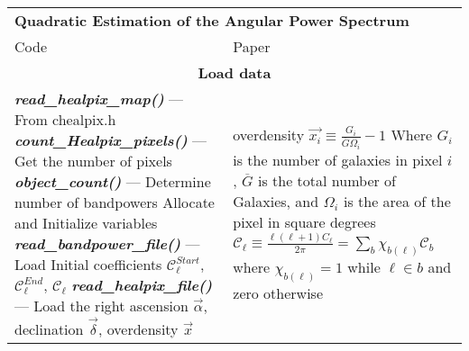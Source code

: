 \documentclass{article}
\newcommand{\func}[1] {\textbf{\textit{#1()}}}
\begin{document}
\setlength\LTleft{0pt}
\setlength\LTright{0pt}
\begin{longtable}{@{\extracolsep{\fill}}p{}
                                         p{}@{}}
\multicolumn{2}{l}{\bf Quadratic Estimation of the Angular Power Spectrum} \\
Code & Paper  \\
\hline
\multicolumn{2}{c}{\bf Load data} \\ \hline
\func{read\_healpix\_map} \newline
--- From chealpix.h \newline
\func{count\_Healpix\_pixels} \newline
--- Get the number of pixels \newline
\func{object\_count} \newline
--- Determine number of bandpowers \newline
Allocate and Initialize variables \newline
\func{read\_bandpower\_file} \newline
--- Load Initial coefficients $\mathcal{C}^{Start}_{\ell}$, $\mathcal{C}^{End}_{\ell}$, $\mathcal{C}_{\ell}$ \newline
\func{read\_healpix\_file} \newline
--- Load the right ascension $\vec{\alpha}$, declination $\vec{\delta}$, overdensity $\vec{x}$\newline
& %
overdensity
$\vec{x_i} \equiv \frac{G_i}{\overline{G}\Omega_i} - 1$ \newline 
Where $G_i$ is the number of galaxies in pixel $i$, $\overline{G}$ is the total number of Galaxies, and $\Omega_i$ is the area of the pixel in square degrees \newline 
\newline
$\mathcal{C}_\ell \equiv \frac{\ell(\ell+1)C_{\ell}}{2\pi} = \sum_{b} \chi_{b(\ell)} \mathcal{C}_b$ \newline \newline
where $\chi_{b(\ell)} = 1$ while $\ell \in b$ and zero otherwise 
\\ %



\end{longtable}
\end{document}
